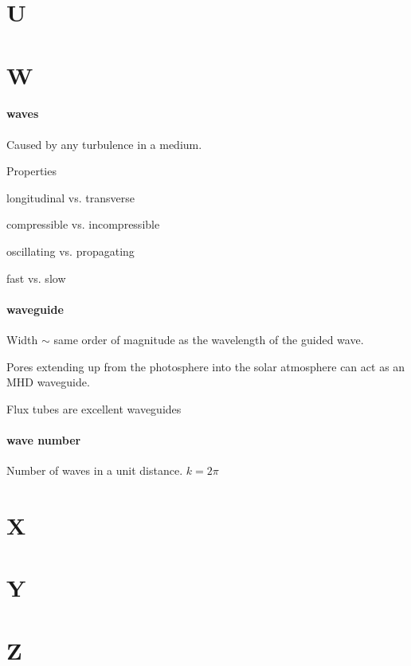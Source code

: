 \documentclass[12pt]{article}
\begin{document}
\section*{U}
\section*{W}

\paragraph{waves}
\begin{itemize*}
    \item Caused by any turbulence in a medium.
    \item Properties
        \begin{itemize*}
            \item longitudinal vs. transverse
            \item compressible vs. incompressible
            \item oscillating vs. propagating
            \item fast vs. slow
        \end{itemize*}
\end{itemize*}

\paragraph{waveguide}
\begin{itemize*}
    \item Width $\sim$ same order of magnitude as the wavelength of
        the guided wave.
    \item Pores extending up from the photosphere
        into the solar atmosphere can act as an
        MHD waveguide.
    \item Flux tubes are excellent waveguides
\end{itemize*}

\paragraph{wave number}
Number of waves in a unit distance.
$ k = 2\pi $

\section*{X}
\section*{Y}
\section*{Z}
\end{document}

